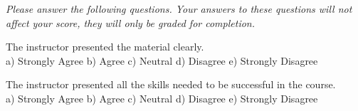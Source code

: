 \documentclass[10pt]{examdesign}
\begin{document}
\begin{multiplechoice} [title={Survey Questions (1 Point Each)},
	rearrange=no]
	\textit{Please answer the following questions.  Your answers to these questions will not affect your score, they will only be graded for completion.  } 

\begin{question}
	 The instructor presented the material clearly.
\\a) Strongly Agree	b) Agree	c) Neutral	d) Disagree	e) Strongly Disagree
\end{question}

\begin{question}
 The instructor presented all the skills needed to be successful in the course.
\\a) Strongly Agree	b) Agree	c) Neutral	d) Disagree	e) Strongly Disagree
\end{question}


\end{multiplechoice}
\end{document}
